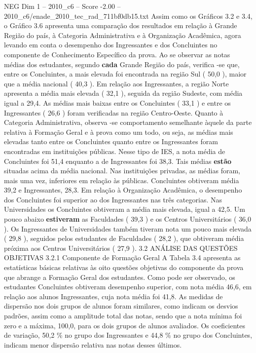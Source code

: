 \begin{textsample}{NEG Dim 1 – 2010\_c6 – Score -2.00 – 2010\_c6/enade\_2010\_tec\_rad\_711bf0db15.txt}
Assim como os Gráficos 3.2 e 3.4, o Gráfico 3.6 apresenta uma comparação dos resultados em relação à Grande Região do país, à Categoria Administrativa e à Organização Acadêmica, agora levando em conta o desempenho dos Ingressantes e dos Concluintes no componente de Conhecimento Específico da prova.
Ao se observar as notas médias dos estudantes, segundo \textbf{cada} Grande Região do país, verifica -se que, entre os Concluintes, a mais elevada foi encontrada na região Sul ( 50,0 ), maior que a média nacional ( 40,3 ).
Em relação aos Ingressantes, a região Norte apresenta a média mais elevada ( 32,1 ), seguida da região Sudeste, com média igual a 29,4.
As médias mais baixas entre os Concluintes ( 33,1 ) e entre os Ingressantes ( 26,6 ) foram verificadas na região Centro-Oeste.
Quanto à Categoria Administrativa, observa -se comportamento semelhante àquele da parte relativa à Formação Geral e à prova como um todo, ou seja, as médias mais elevadas tanto entre os Concluintes quanto entre os Ingressantes foram encontradas em instituições públicas.
Nesse tipo de IES, a nota média de Concluintes foi 51,4 enquanto a de Ingressantes foi 38,3.
Tais médias \textbf{estão} situadas acima da média nacional.
Nas instituições privadas, as médias foram, mais uma vez, inferiores em relação às públicas.
Concluintes obtiveram média 39,2 e Ingressantes, 28,3.
Em relação à Organização Acadêmica, o desempenho dos Concluintes foi superior ao dos Ingressantes nas três categorias.
Nas Universidades os Concluintes obtiveram a média mais elevada, igual a 42,5.
Um pouco abaixo \textbf{estiveram} as Faculdades ( 39,3 ) e os Centros Universitários ( 36,0 ).
Os Ingressantes de Universidades também tiveram nota um pouco mais elevada ( 29,8 ), seguidos pelos estudantes de Faculdades ( 28,2 ), que obtiveram média próxima aos Centros Universitários ( 27,9 ). 3.2 ANÁLISE DAS QUESTÕES OBJETIVAS 3.2.1 Componente de Formação Geral A Tabela 3.4 apresenta as estatísticas básicas relativas às oito questões objetivas do componente da prova que abrange a Formação Geral dos estudantes.
Como pode ser observado, os estudantes Concluintes obtiveram desempenho superior, com nota média 46,6, em relação aos alunos Ingressantes, cuja nota média foi 41,8.
As medidas de dispersão nos dois grupos de alunos foram similares, como indicam os desvios padrões, assim como a amplitude total das notas, sendo que a nota mínima foi zero e a máxima, 100,0, para os dois grupos de alunos avaliados.
Os coeficientes de variação, 50,2 \% no grupo dos Ingressantes e 44,8 \% no grupo dos Concluintes, indicam menor dispersão relativa nas notas desses últimos.

\end{textsample}

